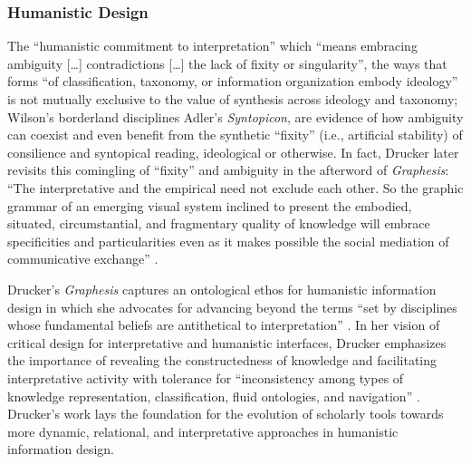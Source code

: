 \subsubsection{Humanistic Design}
The “humanistic commitment to interpretation” which “means embracing ambiguity […] contradictions […] the lack of fixity or singularity”, the ways that forms “of classification, taxonomy, or information organization embody ideology” \citep[p. 178]{drucker_graphesis_2014}  is not mutually exclusive to the value of synthesis across ideology and taxonomy; Wilson’s borderland disciplines Adler’s \textit{Syntopicon}, are evidence of how ambiguity can coexist and even benefit from the synthetic “fixity” (i.e., artificial stability) of consilience and syntopical reading, ideological or otherwise. In fact, Drucker later revisits this comingling of “fixity” and ambiguity in the afterword of \textit{Graphesis}: “The interpretative and the empirical need not exclude each other. So the graphic grammar of an emerging visual system inclined to present the embodied, situated, circumstantial, and fragmentary quality of knowledge will embrace specificities and particularities even as it makes possible the social mediation of communicative exchange” \citep[p. 196]{drucker_graphesis_2014}.

Drucker’s \textit{Graphesis} captures an ontological ethos for humanistic information design in which she advocates for advancing beyond the terms “set by disciplines whose fundamental beliefs are antithetical to interpretation” \citep[p. 178]{drucker_graphesis_2014}. In her vision of critical design for interpretative and humanistic interfaces, Drucker emphasizes the importance of revealing the constructedness of knowledge and facilitating interpretative activity with tolerance for “inconsistency among types of knowledge representation, classification, fluid ontologies, and navigation” \citep[p. 178]{drucker_graphesis_2014}. Drucker’s work lays the foundation for the evolution of scholarly tools towards more dynamic, relational, and interpretative approaches in humanistic information design.

